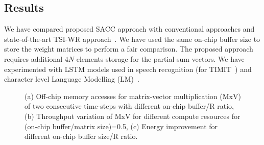 \documentclass[a4paper,10pt]{article}
\begin{document}
\subsection{Results}
We have compared proposed SACC approach with conventional approaches and state-of-the-art TSI-WR approach~\cite{park2020time}. We have used the same on-chip buffer size to store the weight matrices to perform a fair comparison. The proposed approach requires additional $4N$ elements storage for the partial sum vectors. We have experimented with LSTM models used in speech recognition (for TIMIT~\cite{garofolo1993timit}) and character level Language Modelling (LM)~\cite{sundermeyer2015feedforward}.
\begin{figure}[htb!]
	\centering
    \captionsetup{font=sf}	
	\caption{ (a) Off-chip memory accesses for matrix-vector multiplication (MxV) of two consecutive time-steps with different on-chip buffer/R ratio, (b) Throughput variation of MxV for different compute resources for (on-chip buffer/matrix size){=}0.5, (c) Energy improvement for different on-chip buffer size/R ratio.}
	\label{fig:throughputVsPF}
\end{figure}
\end{document}
